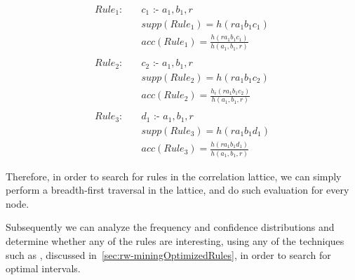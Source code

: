 \begin{align*}
Rule_1: \quad &c_1\text{ :- }a_1,b_1,r \\ 
&supp(Rule_1) = h(r a_1 b_1 c_1) \\
&acc(Rule_1) = \frac{h(r a_1 b_1 c_1)}{h(a_1,b_1,r)} \\ \\
Rule_2: \quad &c_2\text{ :- }a_1,b_1,r \\
 &supp(Rule_2) = h(r a_1 b_1 c_2) \\
 &acc(Rule_2) = \frac{h_i(r a_1 b_1 c_2)}{h(a_1,b_1,r)} \\ \\
Rule_3: \quad &d_1\text{ :- }a_1,b_1,r \\
 &supp(Rule_3) = h(r a_1 b_1 d_1) \\
 &acc(Rule_3) = \frac{h(r a_1 b_1 d_1)}{h(a_1,b_1,r)} 
\end{align*}

Therefore, in order to search for rules in the correlation lattice, we can simply perform a breadth-first traversal in
the lattice, and do such evaluation for every node. 

Subsequently we can analyze the frequency and confidence distributions and determine whether any of the rules are
interesting, using any of the techniques such as \citet{Brin99miningoptimized}, discussed
in~\ref{sec:rw-miningOptimizedRules}, in order to search for optimal intervals.


% 



